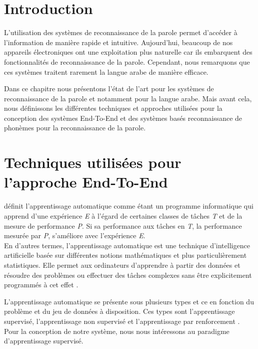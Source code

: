 \section{Introduction}
L'utilisation des systèmes de reconnaissance de la parole permet d'accéder à l'information de manière rapide et intuitive. Aujourd'hui, beaucoup de nos appareils électroniques ont une exploitation plus naturelle car ils embarquent des fonctionnalités de reconnaissance de la parole. Cependant, nous remarquons que ces systèmes traitent rarement la langue arabe de manière efficace.

Dans ce chapitre nous présentons l'état de l'art pour les systèmes de reconnaissance de la parole et notamment pour la langue arabe. Mais avant cela, nous définissons les différentes techniques et approches utilisées pour la conception des systèmes End-To-End et des systèmes basés reconnaissance de phonèmes pour la reconnaissance de la parole.

\section{Techniques utilisées pour l'approche End-To-End}
\cite{ml} définit l'apprentissage automatique comme étant un programme informatique qui apprend d'une expérience \textit{E} à l'égard de certaines classes de tâches \textit{T} et de la mesure de performance \textit{P}. Si sa performance aux tâches en \textit{T}, la performance mesurée par \textit{P}, s'améliore avec l'expérience \textit{E}.\\ En d'autres termes, l'apprentissage automatique est une technique d'intelligence artificielle basée sur différentes notions mathématiques et plus particulièrement statistiques. Elle permet aux ordinateurs d'apprendre à partir des données et résoudre des problèmes ou effectuer des tâches complexes sans être explicitement programmés à cet effet \cite{Goodfellow-et-al-2016}.

L'apprentissage automatique se présente sous plusieurs types et ce en fonction du problème et du jeu de données à disposition. Ces types sont l'apprentissage supervisé, l'apprentissage non supervisé et l'apprentissage par renforcement \cite{typesml}. Pour la conception de notre système, nous nous intéressons au paradigme d'apprentissage supervisé.

